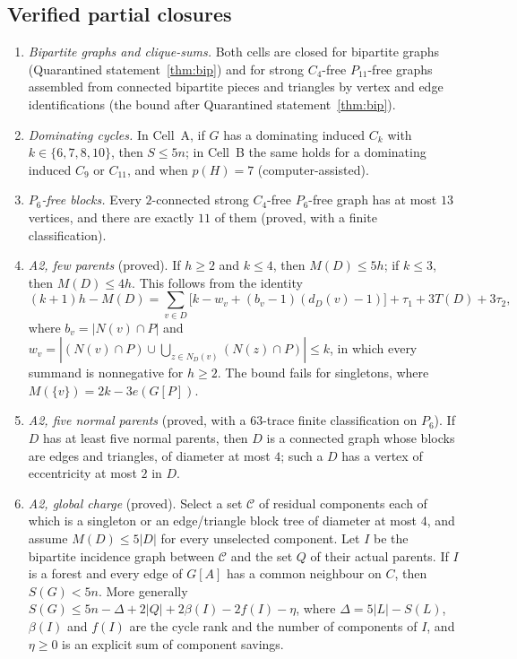 \documentclass[11pt]{amsart}
\theoremstyle{definition}
\theoremstyle{remark}
\newcommand{\pp}{p}
\begin{document}
\subsection*{Verified partial closures}
\begin{enumerate}
\item \emph{Bipartite graphs and clique-sums.} Both cells are closed for bipartite graphs (Quarantined statement~\ref{thm:bip}) and for strong $C_4$-free $P_{11}$-free graphs assembled from connected bipartite pieces and triangles by vertex and edge identifications (the bound after Quarantined statement~\ref{thm:bip}).
\item \emph{Dominating cycles.} In Cell~A, if $G$ has a dominating induced $C_k$ with $k\in\{6,7,8,10\}$, then $S\le5n$; in Cell~B the same holds for a dominating induced $C_9$ or $C_{11}$, and when $\pp(H)=7$ (computer-assisted).
\item \emph{$P_6$-free blocks.} Every $2$-connected strong $C_4$-free $P_6$-free graph has at most $13$ vertices, and there are exactly $11$ of them (proved, with a finite classification).
\item \emph{A2, few parents} (proved). If $h\ge2$ and $k\le4$, then $M(D)\le5h$; if $k\le3$, then $M(D)\le4h$. This follows from the identity
\[
(k+1)h-M(D)=\sum_{v\in D}\bigl[k-w_v+(b_v-1)(d_D(v)-1)\bigr]+\tau_1+3T(D)+3\tau_2,
\]
where $b_v=|N(v)\cap P|$ and $w_v=|(N(v)\cap P)\cup\bigcup_{z\in N_D(v)}(N(z)\cap P)|\le k$, in which every summand is nonnegative for $h\ge2$. The bound fails for singletons, where $M(\{v\})=2k-3e(G[P])$.
\item \emph{A2, five normal parents} (proved, with a $63$-trace finite classification on $P_6$). If $D$ has at least five normal parents, then $D$ is a connected graph whose blocks are edges and triangles, of diameter at most $4$; such a $D$ has a vertex of eccentricity at most $2$ in $D$.
\item \emph{A2, global charge} (proved). Select a set $\mathcal C$ of residual components each of which is a singleton or an edge/triangle block tree of diameter at most $4$, and assume $M(D)\le5|D|$ for every unselected component. Let $I$ be the bipartite incidence graph between $\mathcal C$ and the set $Q$ of their actual parents. If $I$ is a forest and every edge of $G[A]$ has a common neighbour on $C$, then $S(G)<5n$. More generally $S(G)\le5n-\Delta+2|Q|+2\beta(I)-2f(I)-\eta$, where $\Delta=5|L|-S(L)$, $\beta(I)$ and $f(I)$ are the cycle rank and the number of components of $I$, and $\eta\ge0$ is an explicit sum of component savings.

\end{enumerate}
\end{document}
